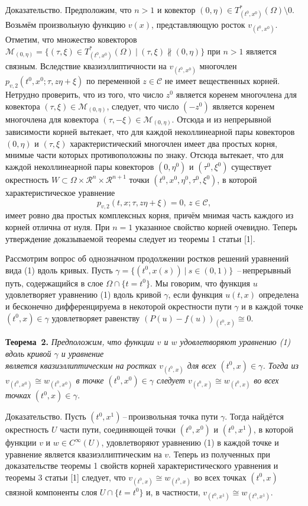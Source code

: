 Доказательство. Предположим, что $n>1$ и ковектор $(0,\eta)\in T^{\ast}_{(t^0,x^0)}(\Omega)\setminus 0$. Возьмём произвольную функцию $v(x)$,  представляющую росток $v_{(t^0,x^0)}$. Отметим, что
множество ковекторов
${\mathcal M}_{(0,\eta)}=\{(\tau,\xi)\in T^{\ast}_{(t^0,x^0)}(\Omega)~|~
(\tau,\xi) \not\parallel (0,\eta)\}$ при $n>1$ является связным. Вследствие квазиэллиптичности на $v_{(t^0,x^0)}$
 многочлен $p_{v,2}(t^0,x^0;\tau,z\eta+\xi)$ по переменной $z\in {\mathcal C}$ не имеет вещественных корней. Нетрудно проверить, что из того, что
число $z^0$ является коренем многочлена для ковектора $(\tau,\xi)\in {\mathcal M}_{(0,\eta)}$, следует, что число $(-z^0)$ является коренем многочлена для ковектора $(\tau,-\xi)\in {\mathcal M}_{(0,\eta)}$. Отсюда и из непрерывной зависимости корней вытекает, что для каждой неколлинеарной пары ковекторов
$(0,\eta)$ и $(\tau,\xi)$ характеристический многочлен имеет два простых корня, мнимые части которых противоположны по знаку. Отсюда вытекает, что для каждой неколлинеарной пары ковекторов $(0,\eta^0)$ и $(\tau^0,\xi^0)$ существует окрестность $W\subset \Omega\times{\mathcal R}^n\times{\mathcal R}^{n+1}$ точки $(t^0,x^0,\eta^0,\tau^0,\xi^0)$, в которой характеристическое уравнение
$$
p_{v,2}(t,x;\tau,z\eta+\xi)=0,\,z\in{\mathcal C},
$$
имеет ровно два простых комплексных корня, причём мнимая часть каждого из корней отлична от нуля. При $n=1$ указанное свойство корней очевидно. Теперь утверждение доказываемой теоремы следует из теоремы 1 статьи [1].

Рассмотрим вопрос об однозначном продолжении ростков решений уравнений вида (1) вдоль кривых.
Пусть $\gamma=\{(t^0,x(s))~|~s\in(0,1)\}$ \,--\,непрерывный путь, содержащийся в слое $\Omega\cap\{t=t^0\}$. Мы говорим, что функция $u$ удовлетворяет уравнению (1) вдоль кривой $\gamma$, если функция $u(t,x)$ определена и бесконечно дифференцируема в некоторой окрестности пути $\gamma$ и в каждой точке $(t^0,x)\in\gamma$ удовлетворяет равенству $(P(u)-f(u))_{(t^0,x)}\cong 0$. 

\textbf{Теорема~2.} {\it 
Предположим, что функции $v$ и $w$ удовлетворяют уравнению {\rm (1)} вдоль кривой $\gamma$ и уравнение
\\является квазиэллиптическим на ростках $v_{(t^0,x)}$ для всех $(t^0,x)\in\gamma$.
Тогда из $v_{(t^0,x^0)}\cong w_{(t^0,x^0)}$ в точке $(t^0,x^0)\in\gamma$ следует $v_{(t^0,x)}\cong w_{(t^0,x)}$ во всех точках $(t^0,x)\in\gamma$.
}

Доказательство. Пусть $(t^0,x^1)$\,--\,произвольная точка пути $\gamma$. Тогда
найдётся окрестность $U$ части пути, соединяющей точки $(t^0,x^0)$ и $(t^0,x^1)$, в которой функции $v$ и $w\in C^{\infty}(U)$, удовлетворяют уравнению (1) в каждой точке и уравнение является квазиэллиптическим на $v$.
Теперь из полученных при доказательстве теоремы 1 свойств корней характеристического уравнения и теоремы 3 статьи [1] следует, что $v_{(t^0,x)}\cong w_{(t^0,x)}$ во всех точках $(t^0,x)$ связной компоненты слоя $U\cap\{t=t^0\}$ и, в частности, $v_{(t^0,x^1)}\cong w_{(t^0,x^1)}$.



